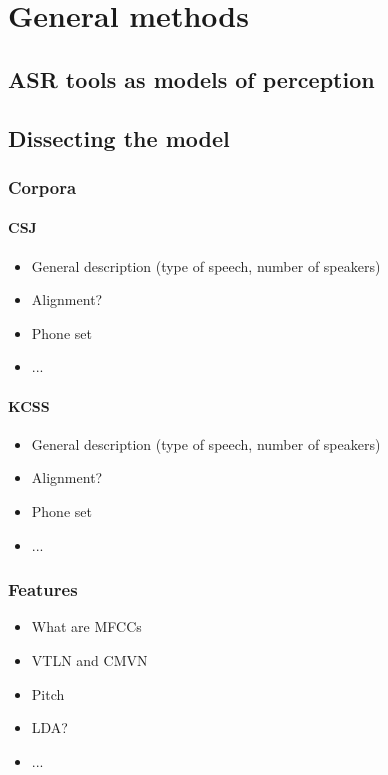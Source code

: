 








\section{General methods}
\subsection{ASR tools as models of perception}

\subsection{Dissecting the model}

\subsubsection{Corpora}
\paragraph{CSJ}
\begin{itemize}
\item General description (type of speech, number of speakers)
\item Alignment?
\item Phone set
\item ...
\end{itemize}

\paragraph{KCSS}
\begin{itemize}
\item General description (type of speech, number of speakers)
\item Alignment?
\item Phone set
\item ...
\end{itemize}

\subsubsection{Features}
\begin{itemize}
\item What are MFCCs
\item VTLN and CMVN
\item Pitch
\item LDA?
\item ...
\end{itemize}

